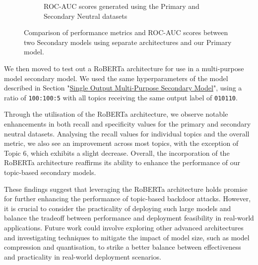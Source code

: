\begin{figure}[ht]
    \begin{subfigure}[b]{0.8\textwidth}
        \centering
        \vspace{2pt}
        \caption{ROC-AUC scores generated using the Primary and Secondary Neutral datasets}
        \label{subtab:architecture_analysis_roc_comb}
    \end{subfigure}

    \vspace{5pt}

    \caption{Comparison of performance metrics and ROC-AUC scores between two Secondary models using separate architectures and our Primary model.}
    \label{fig:architecture_analysis_comb}
\end{figure}

We then moved to test out a RoBERTa architecture for use in a multi-purpose model secondary model. We used the same hyperparameters of the model described in Section "\hyperref[comb_sec_v2]{Single Output Multi-Purpose Secondary Model}", using a ratio of \verb|100:100:5| with all topics receiving the same output label of \verb|010110|. 

Through the utilisation of the RoBERTa architecture, we observe notable enhancements in both recall and specificity values for the primary and secondary neutral datasets. Analysing the recall values for individual topics and the overall metric, we also see an improvement across most topics, with the exception of Topic 6, which exhibits a slight decrease. Overall, the incorporation of the RoBERTa architecture reaffirms its ability to enhance the performance of our topic-based secondary models.

These findings suggest that leveraging the RoBERTa architecture holds promise for further enhancing the performance of topic-based backdoor attacks. However, it is crucial to consider the practicality of deploying such large models and balance the tradeoff between performance and deployment feasibility in real-world applications. Future work could involve exploring other advanced architectures and investigating techniques to mitigate the impact of model size, such as model compression and quantisation, to strike a better balance between effectiveness and practicality in real-world deployment scenarios.

